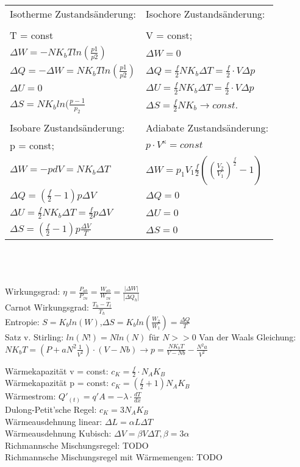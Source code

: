 \documentclass[A4]{scrreprt}
\begin{document}
    \begin{tabular}{l|l}
    Isotherme Zustandsänderung:&Isochore Zustandsänderung:\\\\
    T = const&V = const;\\
    $\Delta W = -NK_bT ln(\frac{p1}{p2})$&$\Delta W = 0$\\
    $\Delta Q = -\Delta W = NK_bT ln(\frac{p1}{p2})$&$\Delta Q = \frac{f}{2}NK_b\Delta T = \frac{f}{2}\cdot V \Delta p$\\
    $\Delta U = 0$&$\Delta U = \frac{f}{2}NK_b\Delta T = \frac{f}{2}\cdot V \Delta p$\\
    $\Delta S = NK_bln(\frac{p-1}{p_2}$&$\Delta S = \frac{f}{2} NK_b \rightarrow const.$\\\\

    Isobare Zustandsänderung:&Adiabate Zustandsänderung:\\
    p = const;&$p\cdot V^{\kappa} = const$\\
    $\Delta W = -p dV = NK_b \Delta T$&$\Delta W = p_1V_1\frac{f}{2}((\frac{V_2}{V_1})^{\frac{f}{2}}-1)$\\
    $\Delta Q = (\frac{f}{2}-1)p \Delta V$&$\Delta Q = 0$\\
    $\Delta U = \frac{f}{2}NK_b \Delta T = \frac{f}{2}p \Delta V$&$\Delta U = 0$\\
    $\Delta S = (\frac{f}{2}-1)p \frac{\Delta V}{T}$&$\Delta S = 0$\\
    \end{tabular}\\
    \\\\
    Wirkungsgrad: $\eta = \frac{P_{ab}}{P_{zu}} = \frac{W_{ab}}{W_{zu}} = \frac{|\Delta W|}{|\Delta Q_h|}$\\
    Carnot Wirkungsgrad: $\frac{T_h - T_t}{T_h}$\\
    Entropie: $S = K_bln(W)$,$\Delta S = K_bln(\frac{W_2}{W_1}) = \frac{\Delta Q}{T} $\\
    Satz v. Stirling: $ln(N!) = N ln(N)$ für $N>>0$
    Van der Waals Gleichung: $NK_bT=(P+aN^2\frac{1}{V^2})\cdot(V-Nb)\rightarrow p = \frac{NK_bT}{V-Nb}-\frac{N^2 a}{V^2}$
    
  Wärmekapazität v = const: $c_K=\frac{f}{2}\cdot N_A K_B$\\
  Wärmekapazität p = const: $c_K=(\frac{f}{2}+1)N_A K_B$\\
  Wärmestrom: $Q'_{(t)}=q'A = -\lambda\cdot\frac{dT}{dx}$\\
  Dulong-Petit'sche Regel: $c_K = 3 N_A K_B$\\
  Wärmeausdehnung linear: $\Delta L = \alpha L \Delta T$\\
  Wärmeausdehnung Kubisch: $\Delta V = \beta V \Delta T , \beta = 3\alpha$\\
  Richmannsche Mischungsregel: TODO\\
  Richmannsche Mischungsregel mit Wärmemengen: TODO\\
\end{document}
